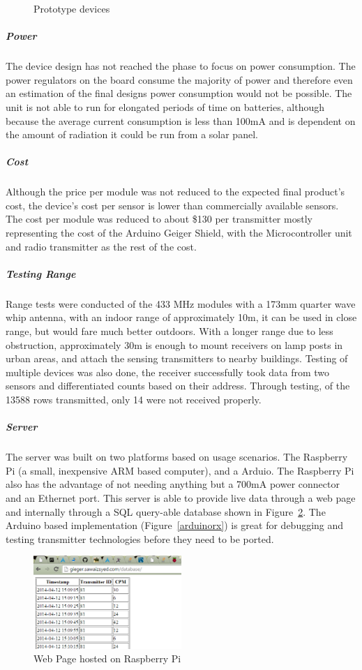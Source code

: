 \documentclass[10pt]{article}
\begin{document}
\begin{figure}
	\caption{Prototype devices}\label{fig:txrx}
\end{figure}

\subparagraph{Power}
The device design has not reached the phase to focus on power consumption. The power regulators on the board consume the majority of power and therefore even an estimation of the final designs power consumption would not be possible. The unit is not able to run for elongated periods of time on batteries, although because the average current consumption is less than 100mA and is dependent on the amount of radiation it could be run from a solar panel.

\subparagraph{Cost}
Although the price per module was not reduced to the expected final product's cost, the device's cost per sensor is lower than commercially available sensors. The cost per module was reduced to about \$130 per transmitter mostly representing the cost of the Arduino Geiger Shield, with the Microcontroller unit and radio transmitter as the rest of the cost.

\subparagraph{Testing Range}
Range tests were conducted of the 433 MHz modules with a 173mm quarter wave whip antenna, with an indoor range of approximately 10m, it can be used in close range, but would fare much better outdoors. With a longer range due to less obstruction, approximately 30m is enough to mount receivers on lamp posts in urban areas, and attach the sensing transmitters to nearby buildings. Testing of multiple devices was also done, the receiver successfully took data from two sensors and differentiated counts based on their address. Through testing, of the 13588 rows transmitted, only 14 were not received properly.

\subparagraph{Server}

The server was built on two platforms based on usage scenarios. The Raspberry Pi (a small, inexpensive ARM based computer), and a Arduio. The Raspberry Pi also has the advantage of not needing anything but a 700mA power connector and an Ethernet port. This server is able to provide live data through a web page and internally through a SQL query-able database shown in Figure~\ref{webPage}. The Arduino based implementation (Figure~\ref{arduinorx}) is great for debugging and testing transmitter technologies before they need to be ported.

\begin{figure}[h]
	\centering
	\includegraphics[width=0.5\textwidth]{WebDatabase.png}
	\caption{Web Page hosted on Raspberry Pi \label{webPage}}
\end{figure}
\end{document}

